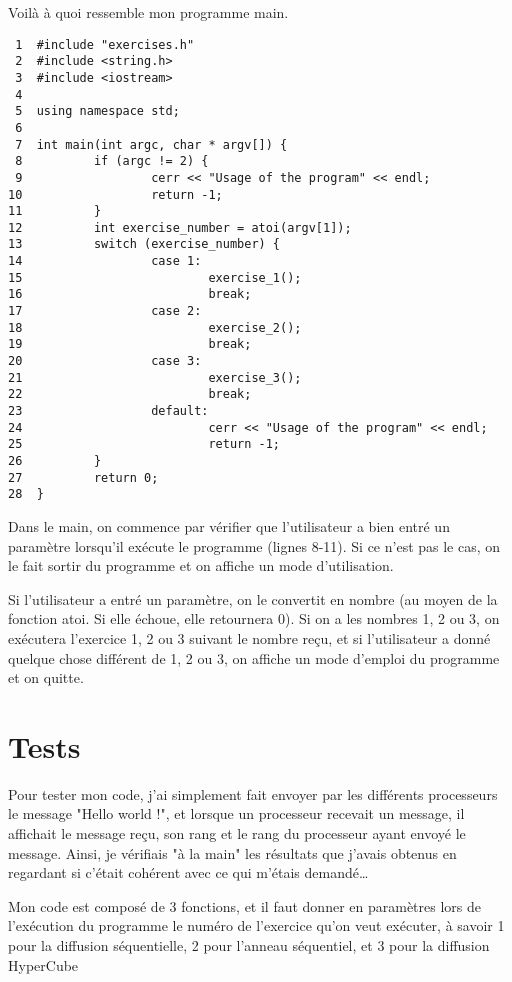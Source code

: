 \documentclass[11pt]{article}
\begin{document}
Voilà à quoi ressemble mon programme main.
\begin{verbatim}
 1  #include "exercises.h"
 2  #include <string.h>
 3  #include <iostream>
 4  
 5  using namespace std;
 6  
 7  int main(int argc, char * argv[]) {
 8          if (argc != 2) {
 9                  cerr << "Usage of the program" << endl;
10                  return -1;
11          }
12          int exercise_number = atoi(argv[1]);
13          switch (exercise_number) {
14                  case 1:
15                          exercise_1();
16                          break;
17                  case 2:
18                          exercise_2();
19                          break;
20                  case 3:
21                          exercise_3();
22                          break;
23                  default:
24                          cerr << "Usage of the program" << endl;
25                          return -1;
26          }
27          return 0;
28  }
\end{verbatim}

Dans le main, on commence par vérifier que l'utilisateur a bien entré un paramètre lorsqu'il exécute le programme (lignes 8-11). Si ce n'est pas le cas, on le fait sortir du programme et on affiche un
mode d'utilisation.

Si l'utilisateur a entré un paramètre, on le convertit en nombre (au moyen de la fonction atoi. Si elle échoue, elle retournera 0). Si on a les nombres 1, 2 ou 3, on exécutera l'exercice 1, 2 ou 3 suivant le nombre reçu,
et si l'utilisateur a donné quelque chose différent de 1, 2 ou 3, on affiche un mode d'emploi du programme et on quitte.


\section{Tests}
\label{sec:org424c017}

Pour tester mon code, j'ai simplement fait envoyer par les différents processeurs le message "Hello world !", et lorsque un processeur recevait un message, il affichait le message reçu,
son rang et le rang du processeur ayant envoyé le message. Ainsi, je vérifiais "à la main" les résultats que j'avais obtenus en regardant si c'était cohérent avec ce qui m'étais demandé\ldots{}

Mon code est composé de 3 fonctions, et il faut donner en paramètres lors de l'exécution du programme le numéro de l'exercice qu'on veut exécuter,
à savoir 1 pour la diffusion séquentielle, 2 pour l'anneau séquentiel, et 3 pour la diffusion HyperCube
\end{document}
